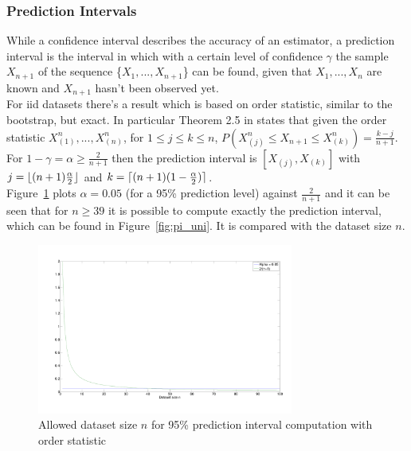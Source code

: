 \documentclass[10pt]{article}
\DeclarePairedDelimiter{\ceil}{\lceil}{\rceil}
\DeclarePairedDelimiter{\floor}{\lfloor}{\rfloor}
\begin{document}
\subsubsection*{Prediction Intervals}
While a confidence interval describes the accuracy of an estimator, a prediction interval is the interval in which with a certain level of confidence $\gamma$ the sample $X_{n+1}$ of the sequence \{$X_1, ... , X_{n+1}$\} can be found, given that $X_1, ..., X_n$ are known and $X_{n+1}$ hasn't been observed yet. \\
For iid datasets there's a result which is based on order statistic, similar to the bootstrap, but exact. In particular Theorem 2.5 in \cite{leb} states that given the order statistic $X_{(1)}^n, ..., X_{(n)}^n$, for $1 \le j \le k \le n$, $P(X_{(j)}^n \le X_{n+1} \le X_{(k)}^n) = \frac{k-j}{n+1}$. For $1 - \gamma = \alpha \ge \frac{2}{n+1}$ then the prediction interval is $[X_{(j)}, X_{(k)}]$ with $j = \floor{(n+1)\frac{\alpha}{2}}$ and $k = \ceil{(n+1)(1-\frac{\alpha}{2})}$.\\
Figure~\ref{fig:alpha} plots $\alpha = 0.05$ (for a 95\% prediction level) against $\frac{2}{n+1}$ and it can be seen that for $n \ge 39$ it is possible to compute exactly the prediction interval, which can be found in Figure~\ref{fig:pi_uni}. It is compared with the dataset size $n$. \\

\begin{figure}[h!]
  \centering
  \includegraphics[width=0.75\textwidth, trim = 0 30 0 50]{images/hw1_4_d_alpha.pdf}
  \caption{Allowed dataset size $n$ for 95\% prediction interval computation with order statistic}
  \label{fig:alpha}
\end{figure}

\clearpage
\end{document}
